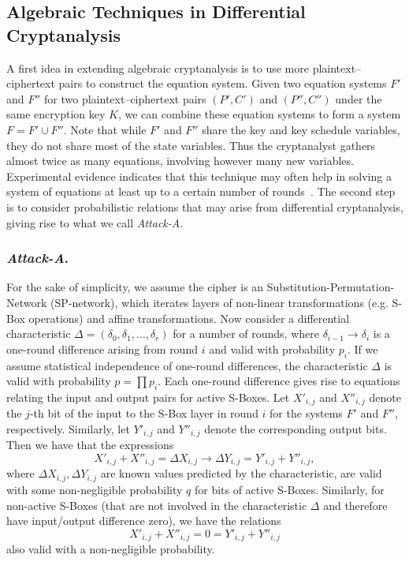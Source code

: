 \subsection{Algebraic Techniques in Differential Cryptanalysis}

A first idea in extending algebraic cryptanalysis is to use more plain\-text--cipher\-text pairs to construct the equation system. Given two equation systems $F'$ and $F''$ for two plaintext--ciphertext pairs $(P',C')$ and $(P'',C'')$ under the same encryption key $K$, we can combine these equation systems to form a system $F = F' \cup F''$. Note that while $F'$ and $F''$ share the key and key schedule variables, they do not share most of the state variables. Thus the cryptanalyst gathers almost twice as many equations, involving however many new variables. Experimental evidence indicates that this technique may often help in solving a system of equations at least up to a certain number of rounds~\cite{faugere:fse2007,bulgin-brickenstein:eprint2008}. The second step is to consider probabilistic relations that may arise from differential cryptanalysis, giving rise to what we call \emph{Attack-A}.

\subsubsection{\emph{Attack-A}.}

For the sake of simplicity, we assume the cipher is an Substitution-Permutation-Network (SP-net\-work), which iterates layers of non-linear transformations (e.g. S-Box operations) and affine transformations. Now consider a differential characteristic $\Delta = (\delta_0, \delta_1, \ldots , \delta_r)$ for a number of rounds, where $\delta_{i-1} \rightarrow \delta_{i}$ is a one-round difference arising from round $i$ and valid with probability $p_{i}$. If we assume statistical independence of one-round differences, the characteristic $\Delta$ is valid with probability $p = \prod p_i$. Each one-round difference gives rise to equations relating the input and output pairs for active S-Boxes. Let $X'_{i,j}$ and $X''_{i,j}$ denote the $j$-th bit of the input to the S-Box layer in round $i$ for the systems $F'$ and $F''$, respectively. Similarly, let $Y'_{i,j}$ and $Y''_{i,j}$ denote the corresponding output bits. Then we have that the expressions
$$
X'_{i,j} + X''_{i,j} = \Delta X_{i,j} \rightarrow \Delta Y_{i,j} = Y'_{i,j} + Y''_{i,j},
$$
where $\Delta X_{i,j}, \Delta Y_{i,j}$ are known values predicted by the characteristic, are valid with some non-neg\-ligible probability $q$ for bits of active S-Boxes. Similarly, for non-active S-Boxes (that are not involved in the characteristic $\Delta$ and therefore have input/output difference zero), we have the relations
$$
X'_{i,j} + X''_{i,j} = 0 = Y'_{i,j} + Y''_{i,j}
$$
also valid with a non-negligible probability.

